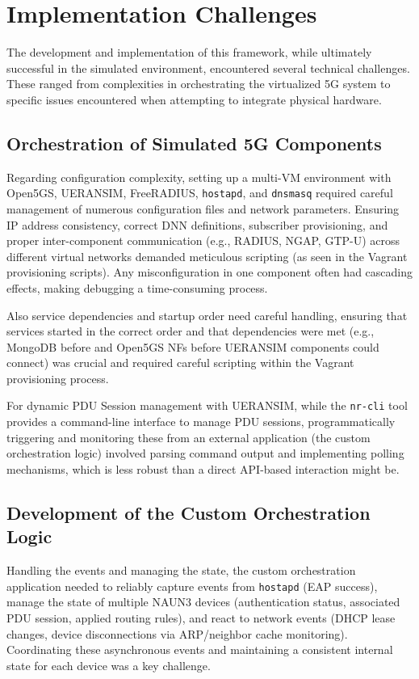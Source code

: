 \section{Implementation Challenges}

The development and implementation of this framework, while ultimately successful in the simulated environment, encountered several technical challenges. These ranged from complexities in orchestrating the virtualized \ac{5G} system to specific issues encountered when attempting to integrate physical hardware.

\subsection{Orchestration of Simulated \acs{5G} Components}

Regarding configuration complexity, setting up a multi-\ac{VM} environment with Open5GS, UERANSIM, FreeRADIUS, \texttt{hostapd}, and \texttt{dnsmasq} required careful management of numerous configuration files and network parameters. Ensuring \ac{IP} address consistency, correct \ac{DNN} definitions, subscriber provisioning, and proper inter-component communication (e.g., \ac{RADIUS}, \ac{NGAP}, \ac{GTP-U}) across different virtual networks demanded meticulous scripting (as seen in the Vagrant provisioning scripts). Any misconfiguration in one component often had cascading effects, making debugging a time-consuming process.

Also service dependencies and startup order need careful handling, ensuring that services started in the correct order and that dependencies were met (e.g., MongoDB before and Open5GS \acp{NF} before UERANSIM components could connect) was crucial and required careful scripting within the Vagrant provisioning process.

For dynamic \ac{PDU} Session management with UERANSIM, while the \texttt{nr-cli} tool provides a command-line interface to manage \ac{PDU} sessions, programmatically triggering and monitoring these from an external application (the custom orchestration logic) involved parsing command output and implementing polling mechanisms, which is less robust than a direct \ac{API}-based interaction might be.

\subsection{Development of the Custom Orchestration Logic}

Handling the events and managing the state, the custom orchestration application needed to reliably capture events from \texttt{hostapd} (\ac{EAP} success), manage the state of multiple \ac{NAUN3} devices (authentication status, associated \ac{PDU} session, applied routing rules), and react to network events (\ac{DHCP} lease changes, device disconnections via \ac{ARP}/neighbor cache monitoring). Coordinating these asynchronous events and maintaining a consistent internal state for each device was a key challenge.

